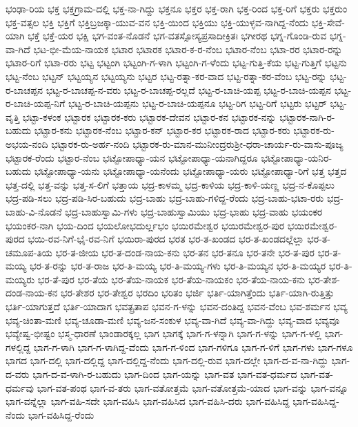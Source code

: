 ಭಂಢಾ-ರಿಯ
ಭಕ್ತ
ಭಕ್ತಗ್ರಾಮ-ದಲ್ಲಿ
ಭಕ್ತ-ನಾ-ಗಿದ್ದು
ಭಕ್ತನೂ
ಭಕ್ತರ
ಭಕ್ತ-ರಾಗಿ
ಭಕ್ತ-ರಿಂದ
ಭಕ್ತ-ರಿಗೆ
ಭಕ್ತರು
ಭಕ್ತರುಂ
ಭಕ್ತ-ವತ್ಸಲ
ಭಕ್ತಿ
ಭಕ್ತಿಗೆ
ಭಕ್ತಿಬ್ರಜಕ್ಕಾ-ಯುವ-ವನ
ಭಕ್ತಿ-ಯಿಂದ
ಭಕ್ತಿಯು
ಭಕ್ತಿ-ಯುಳ್ಳವ-ನಾಗಿದ್ದ-ನೆಂದು
ಭಕ್ತಿ-ಸೇವೆ-ಯಾಗಿ
ಭಕ್ತೆ
ಭಕ್ತೆ-ಯರ
ಭಕ್ಷಿ
ಭಗ-ವಂತ-ನೊಡನೆ
ಭಗ-ವತಸ್ಸೋಸ್ಯಪ್ರಸಾದೀಕ್ರಿತಃ
ಭಗೀರಥ
ಭಗ್ನ-ಗೊಂಡಿ-ರುವ
ಭಗ್ನ-ವಾ-ಗಿದೆ
ಭಟ-ಭೀ-ಮೆಯ-ನಾಯಕ
ಭಟಾರ
ಭಟಾರಕ
ಭಟಾರ-ಕ-ರ-ನೆಂಬ
ಭಟಾರ-ನೆಂಬ
ಭಟಾ-ರರ
ಭಟಾರ-ರನ್ನು
ಭಟಾರ-ರಿಗೆ
ಭಟಾ-ರರು
ಭಟ್ಟ
ಭಟ್ಟಂಗಿ
ಭಟ್ಟಂಗಿ-ಗ-ಳಾಗಿ
ಭಟ್ಟಂಗಿ-ಗ-ಳೆಂದು
ಭಟ್ಟ-ಗುತ್ತಿ-ಕೆಯ
ಭಟ್ಟ-ಗುತ್ತಿಗೆ
ಭಟ್ಟನು
ಭಟ್ಟ-ನೆಂಬ
ಭಟ್ಟನ್
ಭಟ್ಟಯ್ಯನ
ಭಟ್ಟಯ್ಯನು
ಭಟ್ಟರ
ಭಟ್ಟ-ರತ್ನಾ-ಕರ-ವಾದ
ಭಟ್ಟ-ರತ್ನಾ-ಕರ-ವೆಂಬ
ಭಟ್ಟ-ರನ್ನು
ಭಟ್ಟ-ರ-ಬಾಚಪ್ಪನ
ಭಟ್ಟ-ರ-ಬಾಚಪ್ಪ-ನ-ವರು
ಭಟ್ಟ-ರ-ಬಾಚಪ್ಪ-ರಲ್ಲದೆ
ಭಟ್ಟ-ರ-ಬಾಚಿ-ಯಪ್ಪ
ಭಟ್ಟ-ರ-ಬಾಚಿ-ಯಪ್ಪನ
ಭಟ್ಟ-ರ-ಬಾಚಿ-ಯಪ್ಪ-ನಿಗೆ
ಭಟ್ಟ-ರ-ಬಾಚಿ-ಯಪ್ಪನು
ಭಟ್ಟ-ರ-ಬಾಚಿ-ಯಪ್ಪನೂ
ಭಟ್ಟ-ರಿಗ
ಭಟ್ಟ-ರಿಗೆ
ಭಟ್ಟರು
ಭಟ್ಟರ್
ಭಟ್ಟ-ವೃತ್ತಿ
ಭಟ್ಟಾ-ಕಳಂಕ
ಭಟ್ಟಾರಕ
ಭಟ್ಟಾರಕ-ಕರು
ಭಟ್ಟಾರಕ-ದೇವನ
ಭಟ್ಟಾರ-ಕನ
ಭಟ್ಟಾರಕ-ನನ್ನು
ಭಟ್ಟಾರಕ-ನಾಗಿ-ರ-ಬಹುದು
ಭಟ್ಟಾರ-ಕನು
ಭಟ್ಟಾರಕ-ನೆಂಬ
ಭಟ್ಟಾರ-ಕನ್
ಭಟ್ಟಾರ-ಕರ
ಭಟ್ಟಾರಕ-ರಾದ
ಭಟ್ಟಾರ-ಕರು
ಭಟ್ಟಾರಕ-ರು-ಅಭಯ-ನಂದಿ
ಭಟ್ಟಾರಕ-ರು-ಅರ್ಹ-ನಂದಿ
ಭಟ್ಟಾರಕ-ರು-ಮಾನ-ಮುನೀಂದ್ರರುಶ್ರೀ-ಧರಾ-ಚಾರ್ಯ-ರು-ವಾಸು-ಪೂಜ್ಯ
ಭಟ್ಟಾರಕ-ರೆಂದು
ಭಟ್ಟಾರ-ನೆಂಬ
ಭಟ್ಟೋಪಾಧ್ಯಾ-ಯನ
ಭಟ್ಟೋಪಾಧ್ಯಾ-ಯನಾಗಿದ್ದರೂ
ಭಟ್ಟೋಪಾಧ್ಯಾ-ಯನಿರ-ಬಹುದು
ಭಟ್ಟೋಪಾಧ್ಯಾ-ಯನು
ಭಟ್ಟೋಪಾಧ್ಯಾ-ಯನೆಂದು
ಭಟ್ಟೋಪಾಧ್ಯಾ-ಯರು
ಭಟ್ಟೋಪಾಧ್ಯಾ-ರಿಗೆ
ಭತ್ತ
ಭತ್ತದ
ಭತ್ತ-ದಲ್ಲಿ
ಭತ್ತ-ವನ್ನು
ಭತ್ತ-ಸ-ಲಿಗೆ
ಭತ್ತಾಯ
ಭದ್ರ-ಕಾಳಮ್ಮ
ಭದ್ರ-ಕಾಳಿಯ
ಭದ್ರ-ಕಾಳಿ-ಯಣ್ಣ
ಭದ್ರ-ನ-ಕೊಪ್ಪಲು
ಭದ್ರ-ಪಡಿ-ಸಲು
ಭದ್ರ-ಪಡಿ-ಸಿರ-ಬಹುದು
ಭದ್ರ-ಬಾಹು
ಭದ್ರ-ಬಾಹು-ಗಳಿದ್ದ-ರೆಂದು
ಭದ್ರ-ಬಾಹು-ಭಟಾ-ರರು
ಭದ್ರ-ಬಾಹು-ವಿ-ನೊಡನೆ
ಭದ್ರ-ಬಾಹುಸ್ವಾಮಿ-ಗಳು
ಭದ್ರ-ಬಾಹುಸ್ವಾಮಿಯು
ಭದ್ರ-ಭಾಹು
ಭದ್ರ-ವಾಹು
ಭಯಂಕರ
ಭಯಂಕರ-ನಾಗಿ
ಭಯ-ದಿಂದ
ಭಯಲೋಭದುರ್ಲ್ಲಭಂ
ಭಯಿರಮೇಶ್ವರ
ಭಯಿರಮೇಶ್ವರ-ಪುರ
ಭಯಿರಮೇಶ್ವರ-ಪುರದ
ಭಯಿ-ರವ-ನಿಗೆ-ಭೈ-ರವ-ನಿಗೆ
ಭಯಿರಾ-ಪುರದ
ಭರತ
ಭರ-ತ-ಖಂಡದ
ಭರ-ತ-ಖಂಡದಲ್ಲೆಲ್ಲಾ
ಭರ-ತ-ಚಮೂಪ-ತಿಯ
ಭರ-ತ-ಜೀಯ
ಭರ-ತ-ದಂಡ-ನಾಯ-ಕನು
ಭರ-ತನ
ಭರ-ತನೂ
ಭರ-ತನೇ
ಭರ-ತ-ಪುರ
ಭರ-ತ-ಮಯ್ಯ
ಭರ-ತ-ರನ್ನು
ಭರ-ತ-ರಾಜ
ಭರ-ತಿ-ಮಯ್ಯ
ಭರ-ತಿ-ಮಯ್ಯ-ಗಳು
ಭರ-ತಿ-ಮಯ್ಯನ
ಭರ-ತಿ-ಮಯ್ಯರ
ಭರ-ತಿ-ಮಯ್ಯರು
ಭರ-ತೆ-ಪುರ
ಭರ-ತೆಯ
ಭರ-ತೆಯ-ನಾಯಕ
ಭರ-ತೆಯ-ನಾಯಕಂ
ಭರ-ತೆಯ-ನಾಯ-ಕನು
ಭರ-ತೇಶ-ದಂಡ-ನಾಯ-ಕನ
ಭರ-ತೇಶರ
ಭರ-ತೇಶ್ವರ
ಭರದಿಂ
ಭರಿತಂ
ಭರ್ಜಿ
ಭರ್ತಿ-ಯಾಗಿತ್ತೆಂದು
ಭರ್ತಿ-ಯಾಗಿ-ರುತ್ತಿತ್ತು
ಭರ್ತಿ-ಯಾಗುತ್ತದೆ
ಭರ್ತಿ-ಯಾದಾಗ
ಭವತ್ಪ್ರತಾಪ
ಭವನ-ಗ-ಳನ್ನು
ಭವನ-ದಂತಿದ್ದ
ಭವನ-ವೆಂಬ
ಭವ-ಶರ್ಮನ
ಭವ್ಯ
ಭವ್ಯ-ಚಿಂತಾ-ಮಣಿ
ಭವ್ಯ-ಚೂಡಾ-ಮಣಿ
ಭವ್ಯ-ಜನ-ಸಂಕುಳ
ಭವ್ಯ-ವಾ-ಗಿದೆ
ಭವ್ಯ-ವಾ-ಗಿದ್ದು
ಭವ್ಯ-ವಾದ
ಭವ್ಯವೂ
ಭವ್ಯೇಷ್ವ-ಭೀಷ್ಟಂ
ಭಸ್ಮ-ಧಾರಣೆ
ಭಾಂಡಾರಕ್ಕಲ್ಲ
ಭಾಗ
ಭಾಗಕ್ಕೆ
ಭಾಗ-ಗ-ಳನ್ನಾಗಿ
ಭಾಗ-ಗ-ಳನ್ನು
ಭಾಗ-ಗ-ಳಲ್ಲಿ
ಭಾಗ-ಗಳಲ್ಲಿದ್ದ
ಭಾಗ-ಗ-ಳಾಗಿ
ಭಾಗ-ಗ-ಳಾಗಿದ್ದ-ವೆಂದು
ಭಾಗ-ಗ-ಳಿಂದ
ಭಾಗ-ಗಳಿಗೂ
ಭಾಗ-ಗ-ಳಿಗೆ
ಭಾಗ-ಗಳು
ಭಾಗ-ಗಳೂ
ಭಾಗದ
ಭಾಗ-ದಲ್ಲಿ
ಭಾಗ-ದಲ್ಲಿದ್ದ
ಭಾಗ-ದಲ್ಲಿದ್ದ-ನೆಂದು
ಭಾಗ-ದಲ್ಲಿ-ರುವ
ಭಾಗ-ದಲ್ಲೇ
ಭಾಗ-ದ-ವ-ನಾ-ಗಿದ್ದು
ಭಾಗ-ದ-ವರು
ಭಾಗ-ದ-ವ-ಳಾಗಿ-ರ-ಬಹುದು
ಭಾಗ-ದಿಂದ
ಭಾಗ-ಯನ್ನು
ಭಾಗ-ವತ
ಭಾಗ-ವತ-ಧರ್ಮದ
ಭಾಗ-ವತ-ಧರ್ಮವು
ಭಾಗ-ವತ-ಪಂಥ
ಭಾಗ-ವ-ತರು
ಭಾಗ-ವತೋತ್ತಮೆ
ಭಾಗ-ವತೋತ್ತಮೆ-ಯಾದ
ಭಾಗ-ವನ್ನು
ಭಾಗ-ವನ್ನೂ
ಭಾಗ-ವನ್ನೆಲ್ಲಾ
ಭಾಗ-ವಹಿ-ಸದೇ
ಭಾಗ-ವಹಿಸಿ
ಭಾಗ-ವಹಿಸಿದ
ಭಾಗ-ವಹಿಸಿ-ದರು
ಭಾಗ-ವಹಿಸಿದ್ದ
ಭಾಗ-ವಹಿಸಿದ್ದ-ನೆಂದು
ಭಾಗ-ವಹಿಸಿದ್ದ-ರೆಂದು
